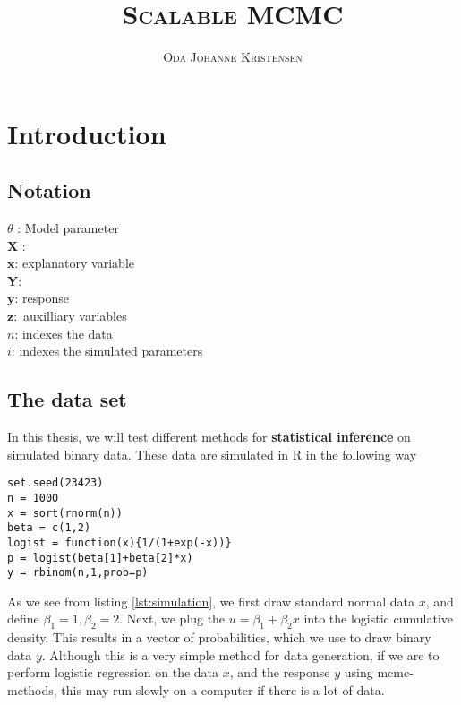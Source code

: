 \documentclass{article}
\title{\textsc{Scalable MCMC}}
\author{\textsc{Oda Johanne Kristensen}}
\date{}
\theoremstyle{definition}
\begin{document}
\maketitle
\section{Introduction}
\subsection{Notation}
$\theta$ : Model parameter \\
$\mathbf{X}$ : \\
$\mathbf{x}$: explanatory variable \\
$\mathbf{Y}$: \\
$\mathbf{y}$: response \\
$\mathbf{z}:$ auxilliary variables \\ 
$n$: indexes the data \\ 
$i$: indexes the simulated parameters 
\subsection{The data set}\label{subsec:data}
In this thesis, we will test different methods for \textbf{statistical inference} on simulated binary data. These data are simulated in R in the following way
\begin{lstlisting}[caption={simulation of binary data}, label={lst:simulation}]
set.seed(23423)
n = 1000
x = sort(rnorm(n))
beta = c(1,2)
logist = function(x){1/(1+exp(-x))}
p = logist(beta[1]+beta[2]*x)
y = rbinom(n,1,prob=p)
\end{lstlisting}
As we see from listing \ref{lst:simulation}, we first draw standard normal data $x$, and define $\beta_1 = 1, \beta_2 = 2$. Next, we plug the  $u = \beta_1 + \beta_2 x$ into the logistic cumulative density. 
This results in a vector of probabilities, which we use to draw binary data $y$. Although this is a very simple method for data generation, if we are to perform logistic regression on the data $x$, and the response $y$ using \gls{mcmc}-methods, this may run slowly on a computer if there is a lot of data.
\end{document}

